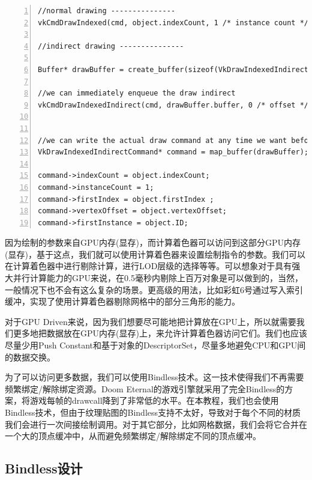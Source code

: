 \documentclass{ctexart}
\begin{document}
\begin{lstlisting}[language={[ANSI]C},keywordstyle=\color{blue!70},commentstyle=\color{red!50!green!50!blue!50},frame=shadowbox, rulesepcolor=\color{red!20!green!20!blue!20},basicstyle=\small,numbers=left, numberstyle=\tiny,breaklines=true]
//normal drawing ---------------
vkCmdDrawIndexed(cmd, object.indexCount, 1 /* instance count */,object.firstIndex, object.vertexOffset, object.ID /* firstInstance */ );

//indirect drawing ---------------

Buffer* drawBuffer = create_buffer(sizeof(VkDrawIndexedIndirectCommand));

//we can immediately enqueue the draw indirect
vkCmdDrawIndexedIndirect(cmd, drawBuffer.buffer, 0 /* offset */, 1 /* drawCount */, sizeof(VkDrawIndexedIndirectCommand));


//we can write the actual draw command at any time we want before VkQueueSubmit(), or from a different thread, or from a compute shader
VkDrawIndexedIndirectCommand* command = map_buffer(drawBuffer);

command->indexCount = object.indexCount;
command->instanceCount = 1;
command->firstIndex = object.firstIndex ;
command->vertexOffset = object.vertexOffset;
command->firstInstance = object.ID;
\end{lstlisting}

因为绘制的参数来自GPU内存(显存)，而计算着色器可以访问到这部分GPU内存(显存)，基于这点，我们就可以使用计算着色器来设置绘制指令的参数。我们可以在计算着色器中进行剔除计算，进行LOD层级的选择等等。可以想象对于具有强大并行计算能力的GPU来说，在0.5毫秒内剔除上百万对象是可以做到的，当然，一般情况下也不会有这么复杂的场景。更高级的用法，比如彩虹6号通过写入索引缓冲，实现了使用计算着色器剔除网格中的部分三角形的能力。

对于GPU Driven来说，因为我们想要尽可能地把计算放在GPU上，所以就需要我们更多地把数据放在GPU内存(显存)上，来允许计算着色器访问它们。我们也应该尽量少用Push Constant和基于对象的DescriptorSet，尽量多地避免CPU和GPU间的数据交换。

为了可以访问更多数据，我们可以使用Bindless技术。这一技术使得我们不再需要频繁绑定/解除绑定资源。Doom Eternal的游戏引擎就采用了完全Bindless的方案，将游戏每帧的drawcall降到了非常低的水平。在本教程，我们也会使用Bindless技术，但由于纹理贴图的Bindless支持不太好，导致对于每个不同的材质我们会进行一次间接绘制调用。对于其它部分，比如网格数据，我们会将它合并在一个大的顶点缓冲中，从而避免频繁绑定/解除绑定不同的顶点缓冲。

\subsection{Bindless设计}
\end{document}
